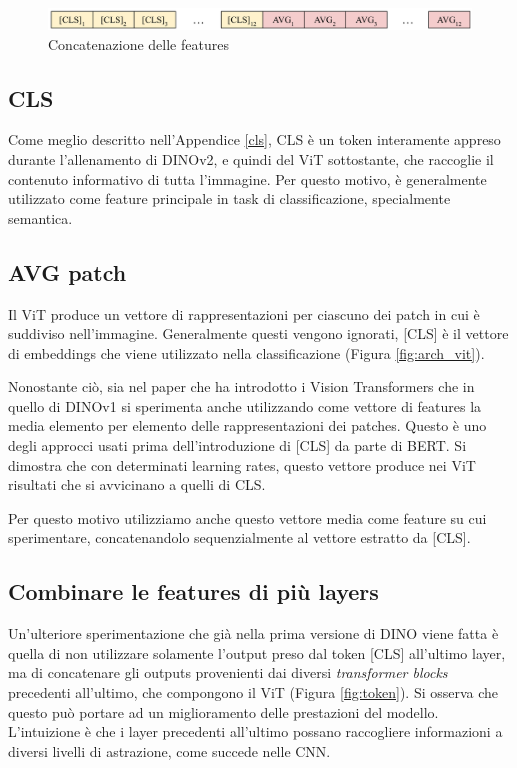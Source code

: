 \begin{figure}[t]
    \centering
    \includegraphics[width=\textwidth]{Immagini/metodo/tokens_conc.pdf}
    \caption{Concatenazione delle features}
    \label{fig:token_conc}
\end{figure}

\subsection{CLS}
Come meglio descritto nell'Appendice \ref{cls}, CLS è un token interamente appreso durante l'allenamento di DINOv2, e quindi del ViT sottostante, che raccoglie il contenuto informativo di tutta l'immagine. Per questo motivo, è generalmente utilizzato come feature principale in task di classificazione, specialmente semantica.

\subsection{AVG patch}
Il ViT produce un vettore di rappresentazioni per ciascuno dei patch in cui è suddiviso nell'immagine. Generalmente questi vengono ignorati, [CLS] è il vettore di embeddings che viene utilizzato nella classificazione (Figura \ref{fig:arch_vit}). 

Nonostante ciò, sia nel paper che ha introdotto i Vision Transformers \cite{vit} che in quello di DINOv1 \cite{dino} si sperimenta anche utilizzando come vettore di features la media elemento per elemento delle rappresentazioni dei patches. Questo è uno degli approcci usati prima dell'introduzione di [CLS] da parte di BERT. Si dimostra che con determinati learning rates, questo vettore produce nei ViT risultati che si avvicinano a quelli di CLS.

Per questo motivo utilizziamo anche questo vettore media come feature su cui sperimentare, concatenandolo sequenzialmente al vettore estratto da [CLS].

\subsection{Combinare le features di più layers}
Un'ulteriore sperimentazione che già nella prima versione di DINO viene fatta è quella di non utilizzare solamente l'output preso dal token [CLS] all'ultimo layer, ma di concatenare gli outputs provenienti dai diversi \textit{transformer blocks} precedenti all'ultimo, che compongono il ViT (Figura \ref{fig:token}). Si osserva che questo può portare ad un miglioramento delle prestazioni del modello. L'intuizione è che i layer precedenti all'ultimo possano raccogliere informazioni a diversi livelli di astrazione, come succede nelle CNN.

